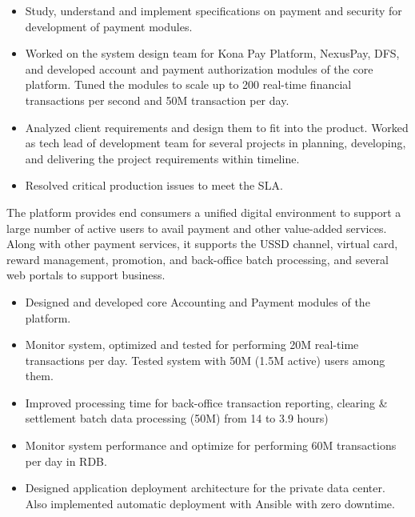 \documentclass[10pt,a4paper,ragged2e]{altacv}
\begin{document}
    \begin{itemize}
        \item Study, understand and implement specifications on payment and security for development of payment modules.
        \item Worked on the system design team for Kona Pay Platform, NexusPay, DFS, and developed account and payment authorization modules of the core platform. Tuned the modules to scale up to 200 real-time financial transactions per second and 50M transaction per day.
        \item Analyzed client requirements and design them to fit into the product. Worked as tech lead of development team for several projects in planning, developing, and delivering the project requirements within timeline.
        \item Resolved critical production issues to meet the SLA.
    \end{itemize}





    The platform provides end consumers a unified digital environment to support a large number of active users to avail payment and other value-added services. Along with other payment services, it supports the USSD channel, virtual card, reward management, promotion, and back-office batch processing, and several web portals to support business.

    \begin{itemize}
        \item Designed and developed core Accounting and Payment modules of the platform.
        \item Monitor system, optimized and tested for performing 20M real-time transactions per day. Tested system with 50M  (1.5M active) users among them.
        \item Improved processing time for back-office transaction reporting, clearing & settlement batch data processing (50M) from 14 to 3.9 hours)
        \item Monitor system performance and optimize for performing 60M transactions per day in RDB.
        \item Designed application deployment architecture for the private data center. Also implemented automatic deployment with Ansible with zero downtime.
    \end{itemize}
\end{document}
